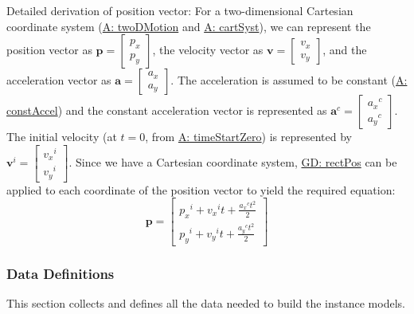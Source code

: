\documentclass[12pt]{article}
\begin{document}
Detailed derivation of position vector:
For a two-dimensional Cartesian coordinate system (\hyperref[twoDMotion]{A: twoDMotion} and \hyperref[cartSyst]{A: cartSyst}), we can represent the position vector as $\mathbf{p}=\begin{bmatrix}
{p_{x}}\\
{p_{y}}
\end{bmatrix}$, the velocity vector as $\mathbf{v}=\begin{bmatrix}
{v_{x}}\\
{v_{y}}
\end{bmatrix}$, and the acceleration vector as $\mathbf{a}=\begin{bmatrix}
{a_{x}}\\
{a_{y}}
\end{bmatrix}$. The acceleration is assumed to be constant (\hyperref[constAccel]{A: constAccel}) and the constant acceleration vector is represented as ${\mathbf{a}^{c}}=\begin{bmatrix}
{{a_{x}}^{c}}\\
{{a_{y}}^{c}}
\end{bmatrix}$. The initial velocity (at $t=0$, from \hyperref[timeStartZero]{A: timeStartZero}) is represented by ${\mathbf{v}^{i}}=\begin{bmatrix}
{{v_{x}}^{i}}\\
{{v_{y}}^{i}}
\end{bmatrix}$. Since we have a Cartesian coordinate system, \hyperref[GD:rectPos]{GD: rectPos} can be applied to each coordinate of the position vector to yield the required equation:
\begin{displaymath}
\mathbf{p}=\begin{bmatrix}
{{p_{x}}^{i}}+{{v_{x}}^{i}} t+\frac{{{a_{x}}^{c}} t^{2}}{2}\\
{{p_{y}}^{i}}+{{v_{y}}^{i}} t+\frac{{{a_{y}}^{c}} t^{2}}{2}
\end{bmatrix}
\end{displaymath}
\subsubsection{Data Definitions}
\label{Sec:DDs}
This section collects and defines all the data needed to build the instance models.
\par~
\end{document}
